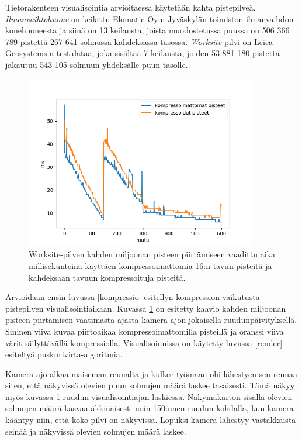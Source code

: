 Tietorakenteen visualisointia arvioitaessa käytetään kahta pistepilveä. \emph{Ilmanvaihtohuone} on keilattu Elomatic Oy:n Jyväskylän toimiston ilmanvaihdon konehuoneesta ja siinä on 13 keilausta, joista muodostetussa puussa on 506 366 789 pistettä 267 641 solmussa kahdeksassa tasossa. \emph{Worksite}-pilvi on Leica Geosystemsin testidataa, joka sisältää 7 keilausta, joiden 53 881 180 pistettä jakautuu 543 105 solmuun yhdeksälle puun tasolle. 

\begin{figure}[h]
    \centering
    \includegraphics[width=0.9\textwidth]{tuloksia/worksite_compressed_vs_uncompressed.png}
    \caption{Worksite-pilven kahden miljoonan pisteen piirtämiseen vaadittu aika millisekunteina käyttäen kompressoimattomia 16:n tavun pisteitä ja kahdeksaan tavuun kompressoituja pisteitä.}
    \label{ws_compr}
\end{figure}

Arvioidaan ensin luvussa \ref{kompressio} esitellyn kompression vaikutusta pistepilven visualisointiaikaan. Kuvassa \ref{ws_compr} on esitetty kaavio kahden miljoonan pisteen piirtämisen vaatimasta ajasta kamera-ajon jokaisella ruudunpäivityksellä. Sininen viiva kuvaa piirtoaikaa kompressoimattomilla pisteillä ja oranssi viiva värit säilyttävällä kompressiolla. Visualisoinnissa on käytetty luvussa \ref{render} esiteltyä puskurivirta-algoritmia. 

Kamera-ajo alkaa maiseman reunalta ja kulkee työmaan ohi lähestyen sen reunaa siten, että näkyvissä olevien puun solmujen määrä laskee tasaisesti. Tämä näkyy myös kuvassa \ref{ws_compr} ruudun visualisointiajan laskiessa. Näkymäkarton sisällä olevien solmujen määrä kasvaa äkkinäisesti noin 150:nnen ruudun kohdalla, kun kamera kääntyy niin, että koko pilvi on näkyvissä. Lopuksi kamera lähestyy vastakkaista seinää ja näkyvissä olevien solmujen määrä laskee. 

